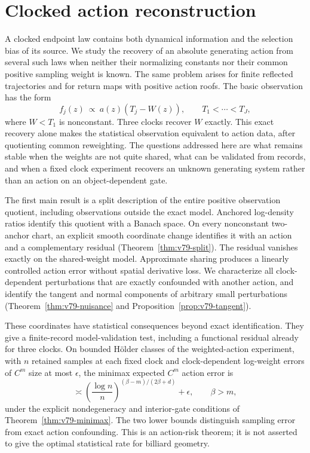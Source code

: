 \section{Clocked action reconstruction}
\label{sec:v78-introduction}

A clocked endpoint law contains both dynamical information and the
selection bias of its source.  We study the recovery of an absolute
generating action from several such laws when neither their normalizing
constants nor their common positive sampling weight is known.  The
same problem arises for finite reflected trajectories and for return
maps with positive action roofs.  The basic observation has the form
\[
                f_j(z)\ \propto\ a(z)(T_j-W(z)),
                  \qquad T_1<\cdots<T_J,
\]
where $W<T_1$ is nonconstant.  Three clocks recover $W$ exactly.
This exact recovery alone makes the statistical observation equivalent
to action data, after quotienting common reweighting.  The questions
addressed here are what remains stable when the weights are not quite
shared, what can be validated from records, and when a fixed clock
experiment recovers an unknown generating system rather than an action
on an object-dependent gate.

The first main result is a split description of the entire positive
observation quotient, including observations outside the exact model.
Anchored log-density ratios identify this quotient with a Banach space.
On every nonconstant two-anchor chart, an explicit smooth coordinate
change identifies it with an action and a complementary residual
(Theorem~\ref{thm:v79-split}).  The residual vanishes exactly on the
shared-weight model.  Approximate sharing produces a linearly controlled
action error without spatial derivative loss.  We characterize all
clock-dependent perturbations that are exactly confounded with another
action, and identify the tangent and normal components of arbitrary
small perturbations (Theorem~\ref{thm:v79-nuisance} and
Proposition~\ref{prop:v79-tangent}).

These coordinates have statistical consequences beyond exact
identification.  They give a finite-record model-validation test,
including a functional residual already for three clocks.  On bounded
H\"older classes of the weighted-action experiment, with $n$ retained
samples at each fixed clock and clock-dependent log-weight errors of
$C^m$ size at most $\epsilon$, the minimax expected $C^m$ action error is
\[
           \asymp\left(\frac{\log n}{n}\right)^{(\beta-m)/(2\beta+d)}
                        +\epsilon,
                 \qquad \beta>m,
\]
under the explicit nondegeneracy and interior-gate conditions of
Theorem~\ref{thm:v79-minimax}.  The two lower bounds distinguish sampling
error from exact action confounding.  This is an action-risk theorem;
it is not asserted to give the optimal statistical rate for billiard
geometry.

